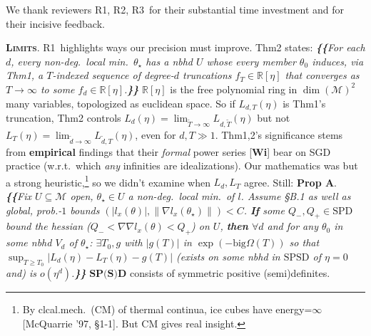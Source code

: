 \documentclass[12pt]{colt2021} %
\newcommand{\Ra}{\textmd{\textsf{\color{purple!50} {R1}}}}
\newcommand{\Rb}{\textmd{\textsf{\color{green!60}  {R2}}}}
\newcommand{\Rc}{\textmd{\textsf{\color{blue!50}   {R3}}}}
\newcommand{\Mm}{\mathcal{M}}
\newcommand{\RR}{\mathbb{R}}
\newcommand{\pag}[1]{\textmd{{\color{gray}Pg}{#1}}}
\newcommand{\pgph}[1]{\textmd{{\color{gray}Par}{#1}}}
\newcommand{\thm}[1]{\textmd{{\color{gray}Thm}{#1}}}
\newcommand{\cit}[1]{[\textbf{#1}]}
\newcommand{\moosect}[1]{\par\noindent\hspace{-1cm}\textsc{\textbf{#1}}.}
\begin{document}
    \newcommand{\LaT}{\Lambda_{\text{\tiny\VarClock}}}
    \newcommand{\Lad}{\Lambda_{\text{\tiny\Thermo{4}}}}

    \noindent
    We thank reviewers \Ra, \Rb, \Rc\ for their substantial time investment
    and for their incisive feedback. 

\moosect{Limits}
    \Ra\ highlights ways our precision must improve. %
    \thm{2} states:
    \emph{\textbf{\{\!\{}For each $d$, every non-deg.\ local min.\ $\theta_\star$ has a nbhd $U$
        whose every member $\theta_0$ induces, via \thm{1}, a
        $T$-indexed sequence of degree-$d$ truncations $f_T\in \RR[\eta]$ that
        converges
        as $T\to \infty$ to
        some $f_d\in\RR[\eta]$.\textbf{\}\!\}}}
    $\RR[\eta]$ is the free polynomial ring in $\dim(\Mm)^2$ many
    variables, topologized as euclidean space.
    \noindent
    So if $L_{d,T}(\eta)$ is \thm{1}'s truncation, \thm{2}
    controls $L_d(\eta) = \lim_{\tilde T\to\infty} L_{d,\tilde T}(\eta)$ but not
    $L_T(\eta) = \lim_{\tilde d\to\infty} L_{\tilde d,T}(\eta)$, even for $d,T\gg 1$. 
    \thm{1,2}'s significance stems from \textbf{empirical} findings that
    their \emph{formal} power series \cit{Wi} bear on SGD practice (w.r.t.\ which \emph{any}
    infinities are idealizations).   
    Our mathematics was but a strong
    heuristic,\footnote{%
        By clcal.mech.\ (CM) of thermal continua, ice cubes have
        energy=$\infty$ [McQuarrie '97, \S{1-1}].
        But CM gives real insight.
    } so we didn't examine when 
    $L_d, L_T$ agree.  Still:
    \textbf{Prop A}.\emph{
    \textbf{\{\!\{}Fix $U\subseteq \Mm$ open, %
        $\theta_\star\in U$ a non-deg.\ local min.\ of $l$.
        Assume \S{B.1} as well as global, prob.-$1$ bounds $(|l_x(\theta)|,\|\nabla
        l_x(\theta_\star)\|)<C$.
        \textbf{If} some $Q_-,Q_+\in \text{SPD}$ bound the hessian
        ($Q_- < \nabla\nabla l_x(\theta)<Q_+$) on $U$,
        \textbf{then} $\forall d$ and for any $\theta_0$ in
        some nbhd $V_d$ of $\theta_\star$: $\exists T_0, g$ with
        $|g(T)|$ in $\exp(-\text{big}\Omega(T))$ so that
        $\sup_{T\geq T_0} |L_d(\eta)-L_T(\eta)-g(T)|$
        (exists on some nbhd in $\text{SPSD}$ of
        $\eta=0$ and) is
        $o(\eta^d)$.\textbf{\}\!\}}
    }
    $\textbf{SP(S)D}$ consists of symmetric positive
        (semi)definites.
\end{document}
